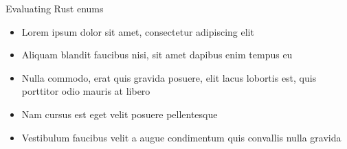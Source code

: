 
\begin{frame}{Evaluating Rust enums}
    \begin{itemize}
        \item Lorem ipsum dolor sit amet, consectetur adipiscing elit
        \item Aliquam blandit faucibus nisi, sit amet dapibus enim tempus eu
        \item Nulla commodo, erat quis gravida posuere, elit lacus lobortis est, quis porttitor odio mauris at libero
        \item Nam cursus est eget velit posuere pellentesque
        \item Vestibulum faucibus velit a augue condimentum quis convallis nulla gravida
    \end{itemize}
\end{frame}


